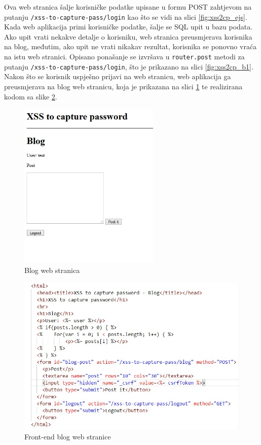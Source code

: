\documentclass[12pt, oneside, onecolumn]{book}
\begin{document}
{Ova web stranica šalje korisničke podatke upisane u formu POST zahtjevom na putanju \texttt{/xss-to-capture-pass/login} kao što se vidi na slici \ref{fig:xss2cp_ejs}. Kada web aplikacija primi korisničke podatke, šalje se SQL upit u bazu podata. Ako upit vrati nekakve detalje o korisniku, web stranica preusmjerava korisnika na blog, međutim, ako upit ne vrati nikakav rezultat, korisnika se ponovno vraća na istu web stranici. Opisano ponašanje se izvršava u \texttt{router.post} metodi za putanju \texttt{/xss-to-capture-pass/login}, što je prikazano na slici \ref{fig:xss2cp_b1}. Nakon što se korisnik uspješno prijavi na web stranicu, web aplikacija ga preusmjerava na blog web stranicu, koja je prikazana na slici \ref{fig:xss2cp_blog} te realizirana kodom sa slike \ref{fig:xss2cp_blog_f}.

\begin{figure}[H]
	\begin{center}
		\includegraphics[width=0.6\textwidth]{xss2cp_blog.jpg}
		\caption{Blog web stranica} \label{fig:xss2cp_blog}
	\end{center}
\end{figure}

\begin{figure}[H]
	\begin{center}
		\includegraphics[width=\textwidth]{xss2cp_blog_f.jpg}
		\caption{Front-end blog web stranice} \label{fig:xss2cp_blog_f}
	\end{center}
\end{figure}

}
\end{document}
